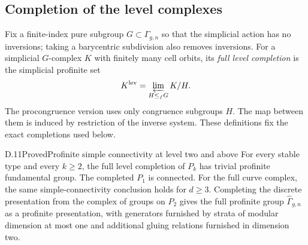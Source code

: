 \subsection{Completion of the level complexes}

Fix a finite-index pure subgroup $G\subset\Gamma_{g,n}$ so that the simplicial action has no inversions; taking a barycentric subdivision also removes inversions. For a simplicial $G$-complex $K$ with finitely many cell orbits, its \emph{full level completion} is the simplicial profinite set
\[
 K^{\mathrm{lev}}=\varprojlim_{H\leq_fG}K/H.
\]
The procongruence version uses only congruence subgroups $H$. The map between them is induced by restriction of the inverse system. These definitions fix the exact completions used below.

\begin{result}{D.11}{Proved}{Profinite simple connectivity at level two and above}
For every stable type and every $k\geq2$, the full level completion of $P_k$ has trivial profinite fundamental group. The completed $P_1$ is connected. For the full curve complex, the same simple-connectivity conclusion holds for $d\geq3$. Completing the discrete presentation from the complex of groups on $P_2$ gives the full profinite group $\widehat\Gamma_{g,n}$ as a profinite presentation, with generators furnished by strata of modular dimension at most one and additional gluing relations furnished in dimension two.
\end{result}
